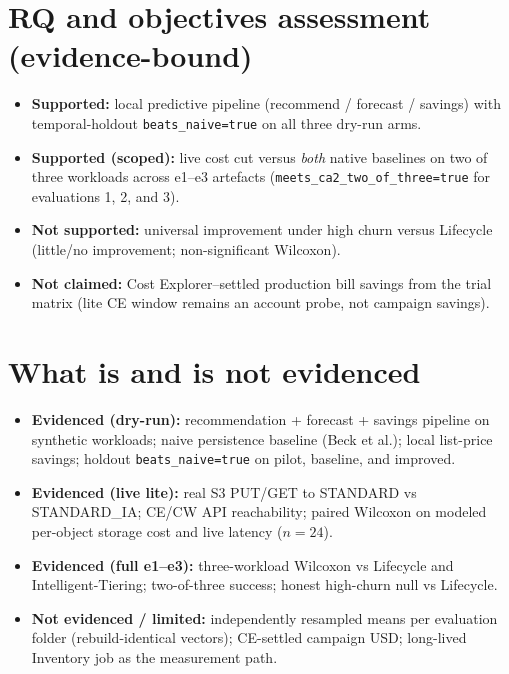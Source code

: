 \section{RQ and objectives assessment (evidence-bound)}

\begin{itemize}
    \item \textbf{Supported:} local predictive pipeline (recommend / forecast / savings)
          with temporal-holdout \texttt{beats\_naive=true} on all three dry-run arms.
    \item \textbf{Supported (scoped):} live cost cut versus \emph{both} native baselines on
          two of three workloads across e1--e3 artefacts
          (\texttt{meets\_ca2\_two\_of\_three=true} for evaluations 1, 2, and 3).
    \item \textbf{Not supported:} universal improvement under high churn versus Lifecycle
          (little/no improvement; non-significant Wilcoxon).
    \item \textbf{Not claimed:} Cost Explorer--settled production bill savings from the
          trial matrix (lite CE window remains an account probe, not campaign savings).
\end{itemize}

\section{What is and is not evidenced}

\begin{itemize}
    \item \textbf{Evidenced (dry-run):} recommendation + forecast + savings pipeline on
          synthetic workloads; naive persistence baseline (Beck et al.); local list-price
          savings; holdout \texttt{beats\_naive=true} on pilot, baseline, and improved.
    \item \textbf{Evidenced (live lite):} real S3 PUT/GET to STANDARD vs STANDARD\_IA;
          CE/CW API reachability; paired Wilcoxon on modeled per-object storage cost and
          live latency ($n{=}24$).
    \item \textbf{Evidenced (full e1--e3):} three-workload Wilcoxon vs Lifecycle and
          Intelligent-Tiering; two-of-three success; honest high-churn null vs Lifecycle.
    \item \textbf{Not evidenced / limited:} independently resampled means per evaluation
          folder (rebuild-identical vectors); CE-settled campaign USD; long-lived Inventory
          job as the measurement path.
\end{itemize}

